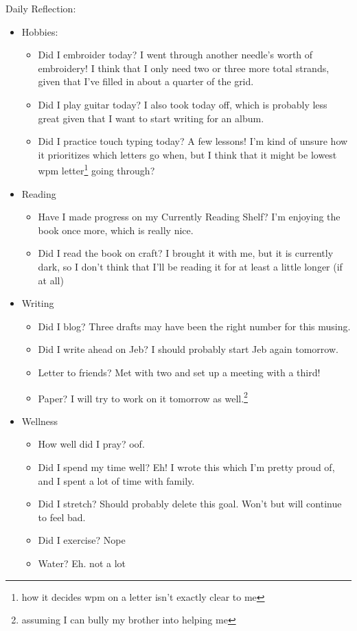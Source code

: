\documentclass[12pt]{article}[titlepage]
\renewcommand{\,}{\textsuperscript{,}}
\begin{document}
Daily Reflection:
\begin{itemize}
\item Hobbies:
\begin{itemize}
\item Did I embroider today? I went through another needle's worth of embroidery! I think that I only need two or three more total strands, given that I've filled in about a quarter of the grid.
\item Did I play guitar today? I also took today off, which is probably less great given that I want to start writing for an album.
\item Did I practice touch typing today? A few lessons! I'm kind of unsure how it prioritizes which letters go when, but I think that it might be lowest wpm letter\footnote{how it decides wpm on a letter isn't exactly clear to me} going through?
\end{itemize}
\item Reading
\begin{itemize}
\item Have I made progress on my Currently Reading Shelf? I'm enjoying the book once more, which is really nice.
\item Did I read the book on craft? I brought it with me, but it is currently dark, so I don't think that I'll be reading it for at least a little longer (if at all)
\end{itemize}
\item Writing
\begin{itemize}
\item Did I blog? Three drafts may have been the right number for this musing.
\item Did I write ahead on Jeb? I should probably start Jeb again tomorrow.
\item Letter to friends? Met with two and set up a meeting with a third!
\item Paper? I will try to work on it tomorrow as well.\footnote{assuming I can bully my brother into helping me}
\end{itemize}
\item Wellness
\begin{itemize}
\item How well did I pray? oof.
\item Did I spend my time well? Eh! I wrote this which I'm pretty proud of, and I spent a lot of time with family.
\item Did I stretch? Should probably delete this goal. Won't but will continue to feel bad.
\item Did I exercise? Nope
\item Water? Eh. not a lot
\end{itemize}
\end{itemize}
\end{document}
